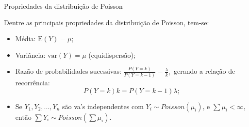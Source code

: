 \documentclass[10pt, aspectratio=169]{beamer}\usepackage[]{graphicx}\usepackage[]{color}
\begin{document}
\begin{frame}{Propriedades da distribuição de Poisson}

Dentre as principais propriedades da distribuição de Poisson, tem-se:
\vspace{0,3cm}
\begin{itemize}

    \item Média: $\mathrm{E}(Y)= \mu$;
    \vspace{0,5cm}
    \item Variância: $\mathrm{var}(Y)=\mu$ (equidispersão);
    \vspace{0,5cm}
    \item Razão de probabilidades sucessivas: 
    $\frac{P\left ( Y = k \right )}{P\left ( Y = k-1 \right )}=\frac{\lambda}{k},$ 
    gerando a relação de recorrência:
    $$
        P(Y=k)k=P(Y=k-1)\lambda;
    $$
    \item Se $Y_{1},Y_{2},...,Y_{n}$ são va's independentes com 
    $Y_{i}\sim Poisson(\mu_{i})$, e $\sum\mu_{i}<\infty$, então 
    $\sum Y_{i}\sim Poisson(\sum\mu_{i})$.
    \end{itemize}
\end{frame}

\end{document}
